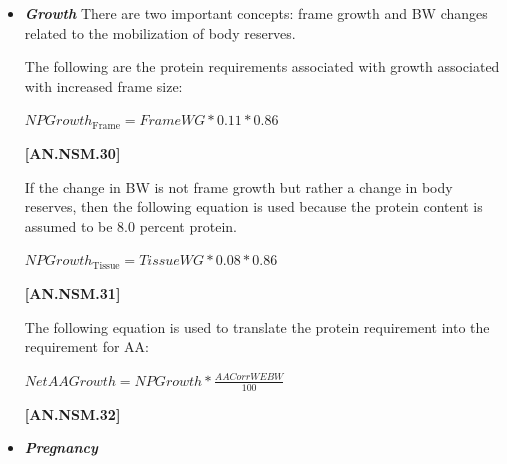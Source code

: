 \begin{refsection}
\begin{itemize}
\begin{enumerate}
\vspace{0.5cm}
            {\raggedleft \textbf{[AN.NSM.29]}\par}
            \vspace{0.5cm}
        
    \end{enumerate}
    \item \textbf{\textit{Growth}} There are two important concepts: frame growth and BW changes related to the mobilization of body reserves. 
    \vspace{0.2cm}
    
    The following are the protein requirements associated with growth associated with increased frame size:
    \begin{center}
    \(NPGrowth_{\text {Frame}} = FrameWG * 0.11 * 0.86\)
    \end{center}

\vspace{0.5cm}
            {\raggedleft \textbf{[AN.NSM.30]}\par}
            \vspace{0.5cm}
            
If the change in BW is not frame growth but rather a change in body reserves, then the following equation is used because the protein content is assumed to be 8.0 percent protein.
\vspace{0.2cm}

    \begin{center}
    \(NPGrowth_{\text {Tissue}} = TissueWG * 0.08 * 0.86\)
    \end{center}

\vspace{0.5cm}
            {\raggedleft \textbf{[AN.NSM.31]}\par}
            \vspace{0.5cm}

The following equation is used to translate the protein requirement into the requirement for AA:
\vspace{0.2cm}
    \begin{center}
    \(NetAAGrowth = NPGrowth * \frac{AACorrWEBW}{100}\)
    \end{center}

\vspace{0.5cm}
            {\raggedleft \textbf{[AN.NSM.32]}\par}
            \vspace{0.5cm}       

    \item \textbf{\textit{Pregnancy}}
\vspace{0.2cm}


\end{itemize}
\end{refsection}
